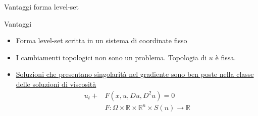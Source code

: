 \begin{frame}{Vantaggi forma level-set}
 \begin{block}{Vantaggi}
   \begin{itemize}
     \item Forma level-set scritta in un sistema di coordinate fisso
     \item I cambiamenti topologici non sono un problema. Topologia di
       $u$ è fissa.
     \item \hyperlink{jumptoend}{Soluzioni che presentano singolarità nel
       gradiente sono ben 
       poste nella classe delle soluzioni di viscosità}
       \[
       \begin{aligned}
         u_t+&F(x,u,Du,D^2u)=0 \\
         &F:\Omega\times\mathbb{R}\times\mathbb{R}^n\times
           S(n)\to\mathbb{R}\\
       \end{aligned}
           \]
   \end{itemize}
 \end{block}
\end{frame}


